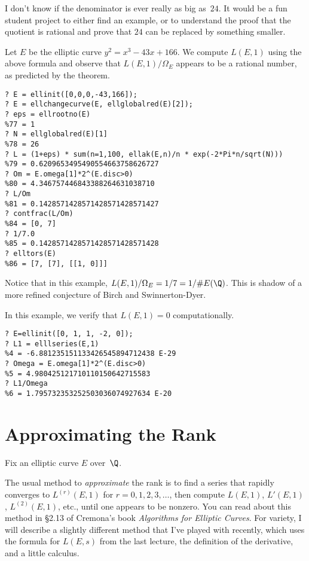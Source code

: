 \documentclass[11pt]{report}
\begin{document}
\begin{remark}
  I don't know if the denominator is ever really as big as~$24$.
  It would be a fun student project to either find an example,
  or to understand the proof that the quotient is rational and
  prove that $24$ can be replaced by something smaller.
\end{remark}


\begin{example}
  Let $E$ be the elliptic curve $y^2 = x^3 - 43x + 166$.
  We compute $L(E,1)$ using the above formula and observe
  that $L(E,1)/\Omega_E$ appears to be a rational number, as predicted by
  the theorem.
  \begin{verbatim}
? E = ellinit([0,0,0,-43,166]);
? E = ellchangecurve(E, ellglobalred(E)[2]);
? eps = ellrootno(E)
%77 = 1
? N = ellglobalred(E)[1]
%78 = 26
? L = (1+eps) * sum(n=1,100, ellak(E,n)/n * exp(-2*Pi*n/sqrt(N)))
%79 = 0.6209653495490554663758626727
? Om = E.omega[1]*2^(E.disc>0)
%80 = 4.346757446843388264631038710
? L/Om
%81 = 0.1428571428571428571428571427
? contfrac(L/Om)
%84 = [0, 7]
? 1/7.0
%85 = 0.1428571428571428571428571428
? elltors(E)
%86 = [7, [7], [[1, 0]]]
\end{verbatim}
  Notice that in this example, $L(E,1)/\Omega_E = 1/7 = 1/\#E(\Q)$.
  This is shadow of a more refined conjecture of Birch and Swinnerton-Dyer.
\end{example}

\begin{example}
  In this example, we verify that $L(E,1)=0$ computationally.
  \begin{verbatim}
? E=ellinit([0, 1, 1, -2, 0]);
? L1 = elllseries(E,1)
%4 = -6.881235151133426545894712438 E-29
? Omega = E.omega[1]*2^(E.disc>0)
%5 = 4.980425121710110150642715583
? L1/Omega
%6 = 1.795732353252503036074927634 E-20
\end{verbatim}
\end{example}

\section{Approximating the Rank}
Fix an elliptic curve $E$ over~$\Q$.

The usual method to {\em approximate} the rank is to find a series
that rapidly converges to $L^{(r)}(E,1)$ for $r=0,1,2,3,\ldots$,
then compute $L(E,1)$, $L'(E,1)$, $L^{(2)}(E,1)$, etc., until
one appears to be nonzero.   You can read about this method in \S2.13
of Cremona's book {\em Algorithms for Elliptic Curves}.   For variety,
I will describe a slightly different method that I've played with
recently, which uses the formula for $L(E,s)$ from the last lecture,
the definition of the derivative, and a little calculus.
\end{document}
